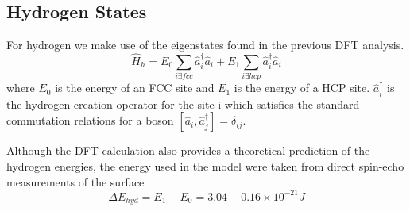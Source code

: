 \subsection{Hydrogen States}
For hydrogen
we make use of the
eigenstates found in
the previous DFT
analysis\cite{Jianding-Zhu}.
\begin{equation}
    \hat{H}_{h} =
    E_0 \sum_{i \exists fcc} \hat{a}^\dagger_i \hat{a}_i
    + E_1 \sum_{i \exists hcp} \hat{a}^\dagger_i \hat{a}_i
\end{equation}
where \(E_0\) is the energy of an FCC site and
\(E_1\) is the energy of a HCP site.
\(\hat{a}^\dagger_i\) is
the hydrogen creation
operator for the site i
which satisfies the standard commutation
relations for a boson
\(\left[ \hat{a}_i, \hat{a}^\dagger_j \right]
= \delta_{ij}\).

Although the DFT calculation
also provides a theoretical prediction
of the hydrogen energies, the
energy used in the
model were
taken from direct spin-echo measurements of the
surface\cite{Jianding-Zhu}
\begin{equation}
    \Delta{}E_{hyd} = E_1 - E_0
    = 3.04\pm0.16\times{}10^{-21} J
    \label{eqn:hydrogen energy difference}
\end{equation}


